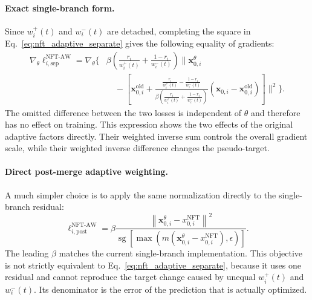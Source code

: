 \documentclass{article} %
\begin{document}
\paragraph{Exact single-branch form.}Since
$w_i^{+}(t)$ and $w_i^{-}(t)$ are detached, completing the square in
Eq.~\ref{eq:nft_adaptive_separate} gives the following equality of gradients:
\begin{align}
\label{eq:nft_adaptive_single_gradient}
\nabla_\theta
\ell_{i,\mathrm{sep}}^{\mathrm{NFT\text{-}AW}}
=
\nabla_\theta
\Bigg\{
&\beta
\left(
\frac{r_i}{w_i^{+}(t)}
+
\frac{1-r_i}{w_i^{-}(t)}
\right)
\Bigg\|
\mathbf{x}_{0,i}^{\theta}
\nonumber\\
&\quad-
\left[
\mathbf{x}_{0,i}^{\mathrm{old}}
+
\frac{
\displaystyle
\frac{r_i}{w_i^{+}(t)}
-
\frac{1-r_i}{w_i^{-}(t)}
}{
\displaystyle
\beta
\left(
\frac{r_i}{w_i^{+}(t)}
+
\frac{1-r_i}{w_i^{-}(t)}
\right)
}
\left(
\mathbf{x}_{0,i}
-
\mathbf{x}_{0,i}^{\mathrm{old}}
\right) \right]
\Bigg\|^2
\Bigg\}.
\end{align}
The omitted difference between the two losses is independent of $\theta$ and
therefore has no effect on training. This expression shows the two effects of
the original adaptive factors directly. Their weighted inverse sum controls
the overall gradient scale, while their weighted inverse difference changes
the pseudo-target. 


\paragraph{Direct post-merge adaptive weighting.}
A much simpler choice is to apply the same normalization directly to the
single-branch residual:
\begin{equation}
\label{eq:nft_postmerge_adaptive}
\ell_{i,\mathrm{post}}^{\mathrm{NFT\text{-}AW}}
=
\beta
\frac{
\left\|
\mathbf{x}_{0,i}^{\theta}
-
x_{0,i}^{\mathrm{NFT}}
\right\|^2
}{
\operatorname{sg}
\left[
\max
\left(
m\left(
\mathbf{x}_{0,i}^{\theta}
-
x_{0,i}^{\mathrm{NFT}}
\right),
\epsilon
\right)
\right]
}.
\end{equation}
The leading $\beta$ matches the current single-branch implementation. This
objective is not strictly equivalent to Eq.~\ref{eq:nft_adaptive_separate},
because it uses one residual and cannot reproduce the target change caused by
unequal $w_i^{+}(t)$ and $w_i^{-}(t)$. Its denominator is the
error of the prediction that is actually optimized. 
\end{document}
